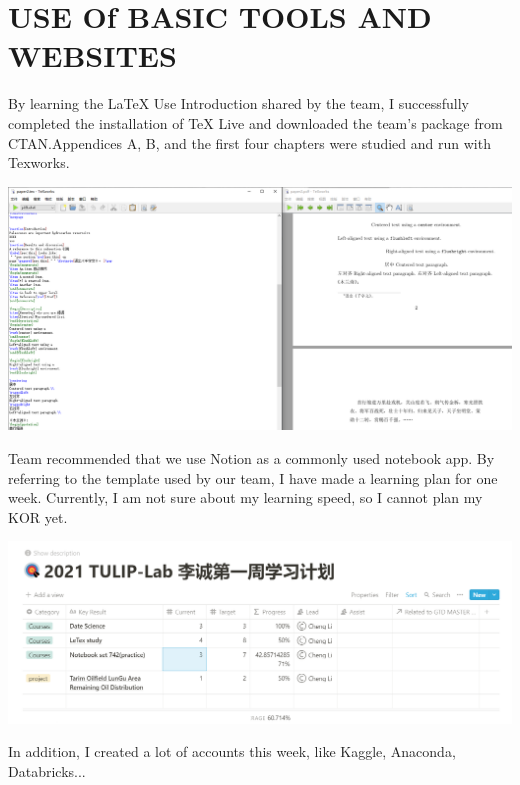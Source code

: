\section{USE Of BASIC TOOLS AND WEBSITES}\label{sec-intro}
By learning the LaTeX Use Introduction shared by the team, I successfully completed the installation of TeX Live and downloaded the team's package from CTAN.Appendices A, B, and the first four chapters were studied and run with Texworks.\par
\includegraphics[scale=0.25]{Latex2}\par
Team recommended that we use Notion as a commonly used notebook app. By referring to the template used by our team, I have made a learning plan for one week. Currently, I am not sure about my learning speed, so I cannot plan my KOR yet.\par
\includegraphics[scale=0.3]{notion}\par
In addition, I created a lot of accounts this week, like Kaggle, Anaconda, Databricks...\par
